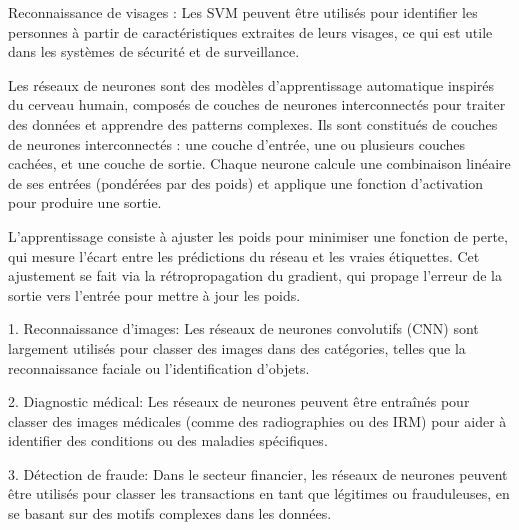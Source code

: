 \documentclass[a4paper,14pt]{article}
\begin{document}
        Reconnaissance de visages : Les SVM peuvent être utilisés pour identifier les personnes à partir de caractéristiques extraites de leurs visages, ce qui est utile dans les systèmes de sécurité et de surveillance.
        
        Les réseaux de neurones sont des modèles d’apprentissage automatique inspirés du cerveau humain, composés de couches de neurones interconnectés pour traiter des données et apprendre des patterns complexes.
        Ils sont constitués de couches de neurones interconnectés : une couche d’entrée, une ou plusieurs couches cachées, et une couche de sortie. Chaque neurone calcule une combinaison linéaire de ses entrées (pondérées par des poids) et applique une fonction d’activation pour produire une sortie.

        L’apprentissage consiste à ajuster les poids pour minimiser une fonction de perte, qui mesure l’écart entre les prédictions du réseau et les vraies étiquettes. Cet ajustement se fait via la rétropropagation du gradient, qui propage l’erreur de la sortie vers l’entrée pour mettre à jour les poids.


        1. Reconnaissance d'images: Les réseaux de neurones convolutifs (CNN) sont largement utilisés pour classer des images dans des catégories, telles que la reconnaissance faciale ou l'identification d'objets.
        
        2. Diagnostic médical: Les réseaux de neurones peuvent être entraînés pour classer des images médicales (comme des radiographies ou des IRM) pour aider à identifier des conditions ou des maladies spécifiques.
        
        3. Détection de fraude: Dans le secteur financier, les réseaux de neurones peuvent être utilisés pour classer les transactions en tant que légitimes ou frauduleuses, en se basant sur des motifs complexes dans les données.

        

\end{document}
